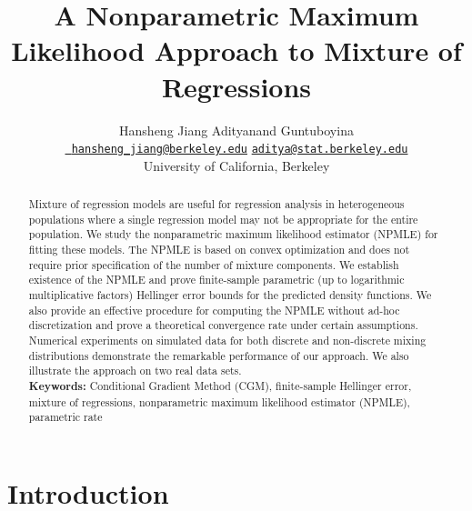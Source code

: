 \documentclass[11pt]{article}
\title{A Nonparametric Maximum Likelihood Approach to Mixture of Regressions}
\author{
\normalfont
  Hansheng Jiang \hspace{5em}
 Adityanand Guntuboyina\\
  \href{mailto:hansheng_jiang@berkeley.edu}{\texttt{ \small hansheng\_jiang@berkeley.edu}}
\hspace{3em}
  \href{mailto:aditya@stat.berkeley.edu}{\texttt{\small aditya@stat.berkeley.edu}}
 \\
 \vspace{2em}
 University of California, Berkeley
 }
\date{}
\newcommand{\keywords}[1]{{\textbf{Keywords:} #1}}
\numberwithin{equation}{section}
\begin{document}
\maketitle

\begin{abstract}
  Mixture of regression models are useful for regression analysis in heterogeneous populations where a single regression model may not be appropriate for the entire population. We study the nonparametric maximum likelihood estimator (NPMLE) for fitting these models. The NPMLE is based on convex optimization and does not require prior specification of the number of mixture components. We establish existence of the NPMLE and prove finite-sample parametric (up to logarithmic multiplicative factors) Hellinger error bounds for the predicted density functions. We also provide an effective procedure for computing the NPMLE without ad-hoc discretization and prove a theoretical convergence rate under certain assumptions. Numerical experiments on simulated data for both discrete and non-discrete mixing distributions demonstrate the remarkable performance of our approach. We also illustrate the approach on two real data sets. \\
\keywords{Conditional Gradient Method (CGM), finite-sample Hellinger error, mixture of regressions, nonparametric maximum likelihood estimator (NPMLE), parametric rate}

\end{abstract}


\section{Introduction}
\label{section:introduction}
\end{document}
